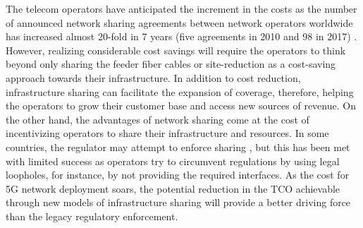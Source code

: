 
The telecom operators have anticipated the increment in the costs as the number of announced network sharing agreements between network operators worldwide has increased almost 20-fold in 7 years (five agreements in 2010 and 98 in 2017) \cite{mckinsey}. However, realizing considerable cost savings will require the operators to think beyond only sharing the feeder fiber cables or site-reduction \cite{5185100} as a cost-saving approach towards their infrastructure. In addition to cost reduction, infrastructure sharing can facilitate the expansion of coverage, therefore, helping the operators to grow their customer base and access new sources of revenue.
On the other hand, the advantages of network sharing come at the cost of incentivizing operators to share their infrastructure and resources. In some countries, the regulator may attempt to enforce sharing \cite{nepal_sharing}, but this has been met with limited success as operators try to circumvent regulations by using legal loopholes, for instance, by not providing the required interfaces. As the cost for \ac{5G} network deployment soars, the potential reduction in the \ac{TCO} achievable through new models of infrastructure sharing will provide a better driving force than the legacy regulatory enforcement.



